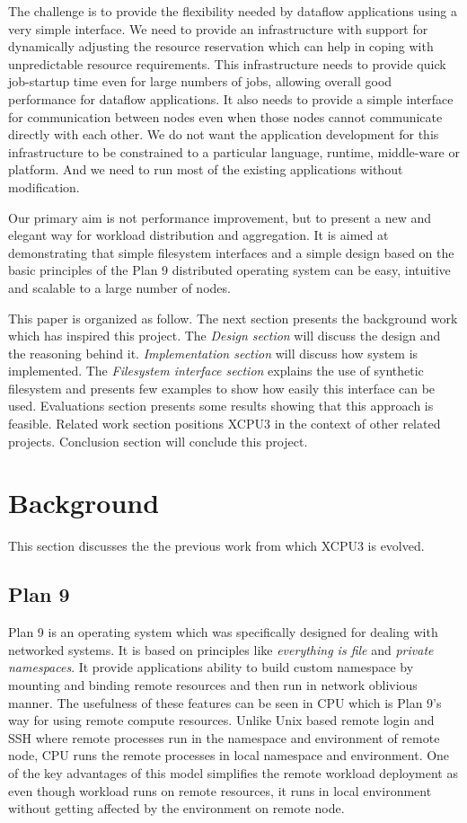\documentclass[conference]{IEEEtran}
\begin{document}
The challenge is to provide the flexibility needed by dataflow applications
using a very simple interface.  We need to provide an infrastructure with
support for dynamically adjusting the resource reservation which can help in
coping with unpredictable resource requirements.  This infrastructure needs to
provide quick job-startup time even for large numbers of jobs, allowing overall
good performance for dataflow applications.  It also needs to provide a simple
interface for communication between nodes even when those nodes cannot
communicate directly with each other. We do not want the application development
for this infrastructure to be constrained to a particular language, runtime,
middle-ware or platform.  And we need to run most of the existing applications
without modification.


Our primary aim is not performance improvement, but to present a new and elegant
way for workload distribution and aggregation.  It is aimed at demonstrating
that simple filesystem interfaces and a simple design based on the basic
principles of the Plan 9 \cite{pike95plan} distributed operating system can be
easy, intuitive and scalable to a large number of nodes.

This paper is organized as follow. The next section presents the background
work which has inspired this project. The \textit{Design section} will discuss
the design and the reasoning behind it. \textit{Implementation section} will
discuss how system is implemented. The \textit{Filesystem interface section}
explains the use of synthetic filesystem and presents few examples to show how
easily this interface can be used. Evaluations section presents some results
showing that this approach is feasible. Related work section positions XCPU3 in
the context of other related projects. Conclusion section will conclude this
project.

\section{Background}
This section discusses the the previous work from which XCPU3 is evolved.

\subsection{Plan 9}
Plan 9 is an operating system which was specifically designed for dealing with
networked systems.  It is based on principles like \textit{everything is file}
and \textit{private namespaces}\cite{namespace}.  It provide applications
ability to build custom namespace by mounting and binding remote resources and
then run in network oblivious manner.  The usefulness of these features can be
seen in CPU\cite{plan9-cpu} which is Plan 9's way for using remote compute
resources.  Unlike Unix based remote login and SSH where remote processes run
in the namespace and environment of remote node, CPU runs the remote processes
in local namespace and environment.  One of the key advantages of this model
simplifies the remote workload deployment as even though workload runs on
remote resources, it runs in local environment without getting affected by the
environment on remote node.
\end{document}
